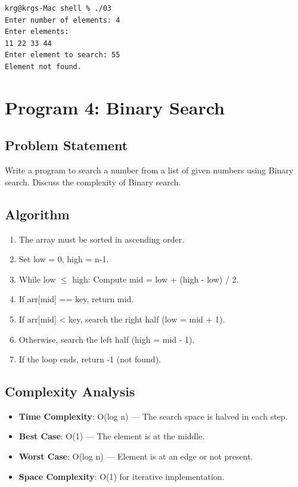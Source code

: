 \documentclass[a4paper,12pt]{article}
\begin{document}
\begin{lstlisting}[style=outputstyle]
krg@krgs-Mac shell % ./03
Enter number of elements: 4
Enter elements:
11 22 33 44
Enter element to search: 55
Element not found.
\end{lstlisting}

\newpage

\section*{Program 4: Binary Search}

\subsection*{Problem Statement}
Write a program to search a number from a list of given numbers using Binary search. Discuss the complexity of Binary search.

\subsection*{Algorithm}
\begin{enumerate}
    \item The array must be sorted in ascending order.
    \item Set low = 0, high = n-1.
    \item While low $\leq$ high: Compute mid = low + (high - low) / 2.
    \item If arr[mid] == key, return mid.
    \item If arr[mid] < key, search the right half (low = mid + 1).
    \item Otherwise, search the left half (high = mid - 1).
    \item If the loop ends, return -1 (not found).
\end{enumerate}

\subsection*{Complexity Analysis}
\begin{itemize}
    \item \textbf{Time Complexity}: O(log n) — The search space is halved in each step.
    \item \textbf{Best Case}: O(1) — The element is at the middle.
    \item \textbf{Worst Case}: O(log n) — Element is at an edge or not present.
    \item \textbf{Space Complexity}: O(1) for iterative implementation.
\end{itemize}
\end{document}
